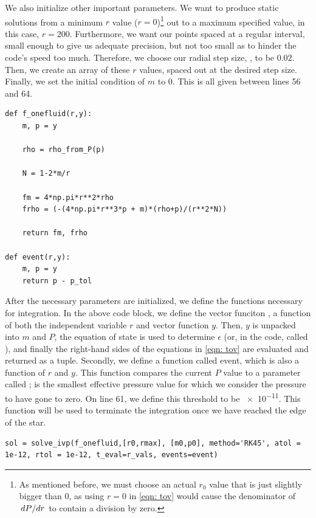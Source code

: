 We also initialize other important parameters. We want to produce static solutions from a minimum $r$ value ($r=0$)\footnote{As mentioned before, we must choose an actual $r_0$ value that is just slightly bigger than 0, as using $r=0$ in \eqref{eqn: tov} would cause the denominator of $\dv*{P}{r}$ to contain a division by zero.} out to a maximum specified value, in this case, $r=200$. Furthermore, we want our points spaced at a regular interval, small enough to give us adequate precision, but not too small as to hinder the code's speed too much. Therefore, we choose our radial step size, , to be $0.02$. Then, we create an array of these $r$ values, spaced out at the desired step size. Finally, we set the initial condition of $m$ to 0. This is all given between lines 56 and 64.

\begin{lstlisting}
def f_onefluid(r,y):
    m, p = y

    rho = rho_from_P(p)

    N = 1-2*m/r

    fm = 4*np.pi*r**2*rho
    frho = (-(4*np.pi*r**3*p + m)*(rho+p)/(r**2*N))

    return fm, frho

def event(r,y):
    m, p = y
    return p - p_tol
\end{lstlisting}

After the necessary parameters are initialized, we define the functions necessary for integration. In the above code block, we define the vector funciton , a function of both the independent variable $r$ and vector function $y$. Then, $y$ is unpacked into $m$ and $P$, the equation of state is used to determine $\epsilon$ (or, in the code, called ), and finally the right-hand sides of the equations in \eqref{eqn: tov} are evaluated and returned as a tuple. Secondly, we define a function called event, which is also a function of $r$ and $y$. This function compares the current $P$ value to a parameter called ;  is the smallest effective pressure value for which we consider the pressure to have gone to zero. On line 61, we define this threshold to be \SI{e-11}{}. This function will be used to terminate the integration once we have reached the edge of the star.

\begin{lstlisting}
sol = solve_ivp(f_onefluid,[r0,rmax], [m0,p0], method='RK45', atol = 1e-12, rtol = 1e-12, t_eval=r_vals, events=event)
\end{lstlisting}

